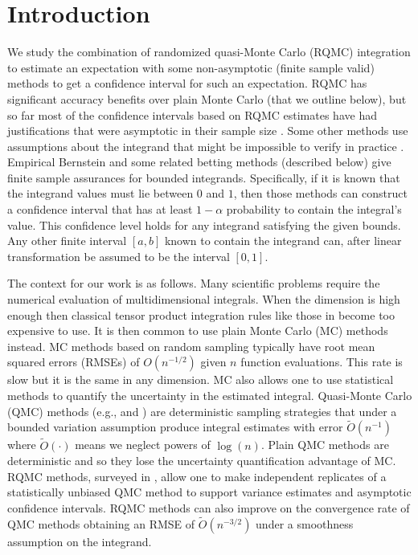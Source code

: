 \documentclass{article}
\newcommand{\art}[1]{\begingroup\color{blue}#1\endgroup}
\begin{document}

\section{Introduction}

We study the combination of randomized quasi-Monte
Carlo (RQMC) integration \art{to estimate an expectation} 
with some non-asymptotic \art{(finite sample valid)} methods
to get a confidence interval for such an expectation.
RQMC has significant accuracy  benefits over plain Monte Carlo (that
we outline below), but so far most of the confidence intervals based on
RQMC estimates have had justifications that were asymptotic
in their sample size \cite{LEcEtal24a}. Some other methods use assumptions about the integrand that might be impossible to verify in practice \cite{HicJim16a,JimHic16a}. Empirical Bernstein and some related betting
methods (described below) give finite sample assurances for bounded integrands.  Specifically, if it is known that the integrand values must lie
between $0$ and $1$, then those methods can construct a confidence
interval that has at least $1-\alpha$ probability to contain
the integral's value.  This confidence level holds for any integrand
satisfying the given bounds.  Any other finite interval $[a,b]$ known
to contain the integrand can, after linear transformation
be assumed to be the interval $[0,1]$.

The context for our work is as follows.
Many scientific problems require the numerical 
evaluation of multidimensional
integrals. When the dimension is high enough then classical tensor product integration rules 
like those in \cite{DavRab84} become too expensive to use.
It is then
common to use plain Monte Carlo (MC) methods instead.  MC
methods based on random sampling typically have root mean
squared errors (RMSEs) of $O(n^{-1/2})$ given $n$
function evaluations.  This rate is slow but it is the
same in any dimension.  MC also allows one to use statistical
methods to quantify the uncertainty in the estimated
integral.  Quasi-Monte Carlo (QMC) 
methods (e.g.,  \cite{DicPil10a} and \cite{Nie92}) are deterministic
sampling strategies that under a bounded variation assumption
produce integral estimates with error $\tilde O(n^{-1})$ where
$\tilde O(\cdot)$ means we neglect powers of $\log(n)$.
Plain QMC methods are deterministic and so they lose the
uncertainty quantification advantage of MC. RQMC methods, 
surveyed in \cite{LEcLem02a}, allow one
to make independent replicates of a statistically
unbiased QMC method to support variance estimates and
asymptotic confidence intervals.  RQMC methods can also
improve on the convergence rate of QMC methods obtaining
an RMSE of $\tilde O(n^{-3/2})$ under a smoothness assumption
\cite{Owe97,Owe08a} on the integrand.  
\end{document}
